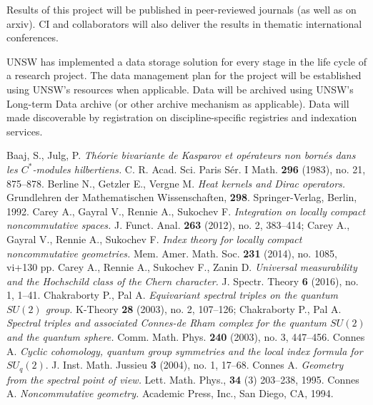 \documentclass[12pt]{article}
\newcommand{\archeading}[1]{\vspace{.3cm} \noindent{\bfseries #1} \vspace{.1cm}   }
\begin{document}
\archeading{Communication of results} Results of this project will be published in peer-reviewed journals (as well as on arxiv). CI and collaborators will also deliver the results in thematic international conferences.


\archeading{Management of data}
UNSW has implemented a data storage solution for every stage in the life cycle of a research project. The data management plan for the project will be established using UNSW's resources when applicable. Data will be archived using UNSW's Long-term Data archive (or other archive mechanism as applicable). Data will made discoverable by registration on discipline-specific registries and indexation services.

\small

\begin{thebibliography}{99}
\setlength{\itemsep}{0pt}
\setlength{\parskip}{0pt}
\setlength{\parsep}{0pt}
 Baaj, S., Julg, P. {\it Th\'eorie bivariante de Kasparov et op\'erateurs non born\'es dans les $C^*$-modules hilbertiens.} C. R. Acad. Sci. Paris S\'er. I Math. {\bf 296} (1983), no. 21, 875--878.
 Berline N., Getzler E., Vergne M. {\it Heat kernels and Dirac operators.} Grundlehren der Mathematischen Wissenschaften, {\bf 298}. Springer-Verlag, Berlin, 1992.
 Carey A., Gayral V., Rennie A., Sukochev F. {\it Integration on locally compact noncommutative spaces.} J. Funct. Anal. {\bf 263} (2012), no. 2, 383--414; Carey A., Gayral V., Rennie A., Sukochev F. {\it Index theory for locally compact noncommutative geometries.} Mem. Amer. Math. Soc. {\bf 231} (2014), no. 1085, vi+130 pp.
 Carey A., Rennie A., Sukochev F., Zanin D. {\it Universal measurability and the Hochschild class of the Chern character.} J. Spectr. Theory {\bf 6} (2016), no. 1, 1--41.
 Chakraborty P., Pal A. {\it Equivariant spectral triples on the quantum $SU(2)$ group.} K-Theory {\bf 28} (2003), no. 2, 107--126;  Chakraborty P., Pal A. {\it Spectral triples and associated Connes-de Rham complex for the quantum $SU(2)$ and the quantum sphere.} Comm. Math. Phys. {\bf 240} (2003), no. 3, 447--456.
 Connes A. {\it Cyclic cohomology, quantum group symmetries and the local index formula for $SU_q(2).$} J. Inst. Math. Jussieu {\bf 3} (2004), no. 1, 17--68.
 Connes A. {\it Geometry from the spectral point of view.} Lett. Math. Phys., {\bf 34} (3) 203--238, 1995.
  Connes A. {\it Noncommutative geometry.} Academic Press, Inc., San Diego, CA, 1994.

\end{thebibliography}
\end{document}
